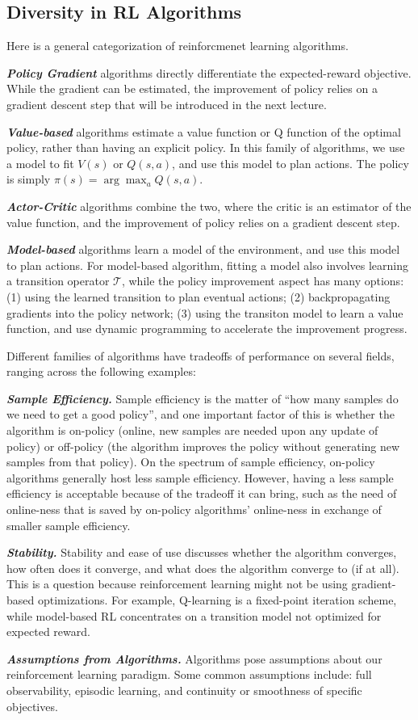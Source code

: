 \subsection{Diversity in RL Algorithms}
Here is a general categorization of reinforcmenet learning algorithms.

\textbf{\textit{Policy Gradient}} algorithms directly differentiate the expected-reward objective.
While the gradient can be estimated, the improvement of policy relies on a gradient descent step that will be introduced in the next lecture.

\textbf{\textit{Value-based}} algorithms estimate a value function or Q function of the optimal policy, rather than having an explicit policy.
In this family of algorithms, we use a model to fit $V(s)$ or $Q(s, a)$, and use this model to plan actions. The policy is simply $\pi(s) = \arg \max_a Q(s, a)$.

\textbf{\textit{Actor-Critic}} algorithms combine the two, where the critic is an estimator of the value function, and the improvement of policy relies on a gradient descent step.

\textbf{\textit{Model-based}} algorithms learn a model of the environment, and use this model to plan actions.
For model-based algorithm, fitting a model also involves learning a transition operator $\mathcal{T}$, while the policy improvement aspect has many options: (1) using the learned transition to plan eventual actions; (2) backpropagating gradients into the policy network; (3) using the transiton model to learn a value function, and use dynamic programming to accelerate the improvement progress.

Different families of algorithms have tradeoffs of performance on several fields, ranging across the following examples:

\textbf{\textit{Sample Efficiency.}}
Sample efficiency is the matter of ``how many samples do we need to get a good policy'', and one important factor of this is whether the algorithm is on-policy (online, new samples are needed upon any update of policy) or off-policy (the algorithm improves the policy without generating new samples from that policy).
On the spectrum of sample efficiency, on-policy algorithms generally host less sample efficiency.
However, having a less sample efficiency is acceptable because of the tradeoff it can bring, such as the need of online-ness that is saved by on-policy algorithms' online-ness in exchange of smaller sample efficiency.

\textbf{\textit{Stability.}}
Stability and ease of use discusses whether the algorithm converges, how often does it converge, and what does the algorithm converge to (if at all).
This is a question because reinforcement learning might not be using gradient-based optimizations.
For example, Q-learning is a fixed-point iteration scheme, while model-based RL concentrates on a transition model not optimized for expected reward.

\textbf{\textit{Assumptions from Algorithms.}}
Algorithms pose assumptions about our reinforcement learning paradigm.
Some common assumptions include: full observability, episodic learning, and continuity or smoothness of specific objectives.
